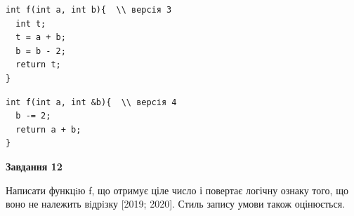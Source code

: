 \documentclass[12pt, ukrainian]{article}
\begin{document}
{\begin {large}
\begin{minipage}[t]{11.0cm}
\vspace{-8mm}\begin{verbatim}
int f(int a, int b){  \\ версія 3
  int t;
  t = a + b;
  b = b - 2;
  return t;
}
\end{verbatim}

\vspace{-8mm}\begin{verbatim}
int f(int a, int &b){  \\ версія 4
  b -= 2;
  return a + b;
}
\end{verbatim}



\begin{center}
\textbf{Завдання 12}
\end{center}

Написати функцiю f, що отримує ціле число і повертає логічну ознаку того, що воно не належить вiдрiзку [2019; 2020]. Стиль запису умови також оцінюється.\par

\end{minipage}

\end {large}}
\newpage
\end{document}
